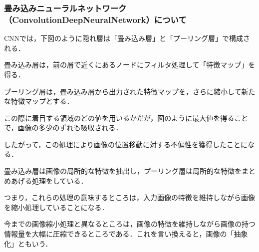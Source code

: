 \documentclass[uplatex,titlepage]{jsarticle}
\newif\iffigure
\begin{document}
\subsubsection{畳み込みニューラルネットワーク（ConvolutionDeepNeuralNetwork）について}
CNNでは，下図のように隠れ層は「畳み込み層」と「プーリング層」で構成される．\par
畳み込み層は，前の層で近くにあるノードにフィルタ処理して「特徴マップ」を得る．\par
プーリング層は，畳み込み層から出力された特徴マップを，さらに縮小して新たな特徴マップとする．\par
この際に着目する領域のどの値を用いるかだが，図のように最大値を得ることで，画像の多少のずれも吸収される．\par
したがって，この処理により画像の位置移動に対する不偏性を獲得したことになる．
\iffigure
\begin{figure}[H]%
    \begin{center}
    \texttt{[image: CNN\_model.png]} 
    \caption{畳み込みニューラルネットワーク}
    \end{center}
\end{figure}
\fi
畳み込み層は画像の局所的な特徴を抽出し，プーリング層は局所的な特徴をまとめあげる処理をしている．\par
つまり，これらの処理の意味するところは，入力画像の特徴を維持しながら画像を縮小処理していることになる．\par
今までの画像縮小処理と異なるところは，画像の特徴を維持しながら画像の持つ情報量を大幅に圧縮できるところである．これを言い換えると，画像の「抽象化」ともいう．

\iffigure
\begin{figure}[H]%
    \begin{center}
    \texttt{[image: CNN\_model2.png]} 
    \caption{畳み込みニューラルネットワーク2}
    \end{center}
\end{figure}
\fi

\newpage
\end{document}
